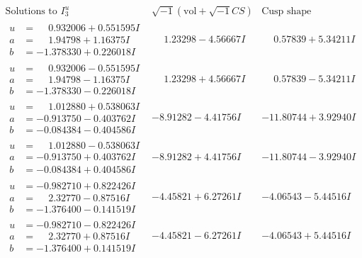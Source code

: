 \documentclass[1p]{elsarticle_modified}
\theoremstyle{definition}
\newcommand{\I}{\sqrt{-1}}
\begin{document}
$$\begin{array}{c|c|c}  
\text{Solutions to }I^u_{3}& \I (\text{vol} + \sqrt{-1}CS) & \text{Cusp shape}\\
 \hline 
\begin{aligned}
u &= \phantom{-}0.932006 + 0.551595 I \\
a &= \phantom{-}1.94798 + 1.16375 I \\
b &= -1.378330 + 0.226018 I\end{aligned}
 & \phantom{-}1.23298 - 4.56667 I & \phantom{-}0.57839 + 5.34211 I \\ \hline\begin{aligned}
u &= \phantom{-}0.932006 - 0.551595 I \\
a &= \phantom{-}1.94798 - 1.16375 I \\
b &= -1.378330 - 0.226018 I\end{aligned}
 & \phantom{-}1.23298 + 4.56667 I & \phantom{-}0.57839 - 5.34211 I \\ \hline\begin{aligned}
u &= \phantom{-}1.012880 + 0.538063 I \\
a &= -0.913750 - 0.403762 I \\
b &= -0.084384 - 0.404586 I\end{aligned}
 & -8.91282 - 4.41756 I & -11.80744 + 3.92940 I \\ \hline\begin{aligned}
u &= \phantom{-}1.012880 - 0.538063 I \\
a &= -0.913750 + 0.403762 I \\
b &= -0.084384 + 0.404586 I\end{aligned}
 & -8.91282 + 4.41756 I & -11.80744 - 3.92940 I \\ \hline\begin{aligned}
u &= -0.982710 + 0.822426 I \\
a &= \phantom{-}2.32770 - 0.87516 I \\
b &= -1.376400 - 0.141519 I\end{aligned}
 & -4.45821 + 6.27261 I & -4.06543 - 5.44516 I \\ \hline\begin{aligned}
u &= -0.982710 - 0.822426 I \\
a &= \phantom{-}2.32770 + 0.87516 I \\
b &= -1.376400 + 0.141519 I\end{aligned}
 & -4.45821 - 6.27261 I & -4.06543 + 5.44516 I \\ \hline\begin{aligned}

\end{aligned}
\end{array}$$
\end{document}
